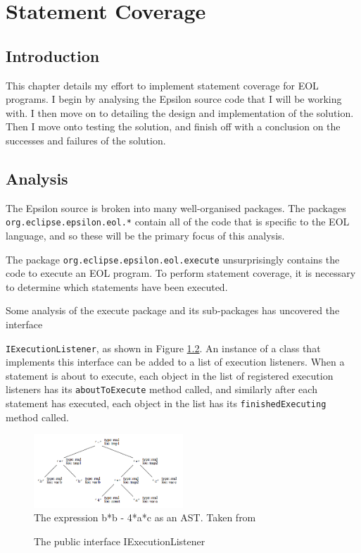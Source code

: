 \chapter{Statement Coverage}
\label{chap:statement}

\section{Introduction}

This chapter details my effort to implement statement coverage for EOL programs. I begin by analysing the Epsilon source code that I will be working with. I then move on to detailing the design and implementation of the solution. Then I move onto testing the solution, and finish off with a conclusion on the successes and failures of the solution.

\section{Analysis}

The Epsilon source is broken into many well-organised packages. The packages \\\verb+org.eclipse.epsilon.eol.*+ contain all of the code that is specific to the EOL language, and so these will be the primary focus of this analysis.

The package \verb+org.eclipse.epsilon.eol.execute+ unsurprisingly contains the code to execute an EOL program. To perform statement coverage, it is necessary to determine which statements have been executed. 

Some analysis of the execute package and its sub-packages has uncovered the interface \\\begin{flushright}

\end{flushright}\verb+IExecutionListener+, as shown in Figure \ref{lst:IExecutionListener}. An instance of a class that implements this interface can be added to a list of execution listeners. When a statement is about to execute, each object in the list of registered execution listeners has its \verb+aboutToExecute+ method called, and similarly after each statement has executed, each object in the list has its \verb+finishedExecuting+ method called.

\begin{figure}
\centering
\includegraphics[width=0.5\textwidth]{figures/AST.png}
\caption{The expression b*b - 4*a*c as an AST. Taken from \citep{grune2000modern}}
\label{fig:AST}
\end{figure}
\begin{figure}
	
	\caption{The public interface IExecutionListener}
	\label{lst:IExecutionListener}
\end{figure}

